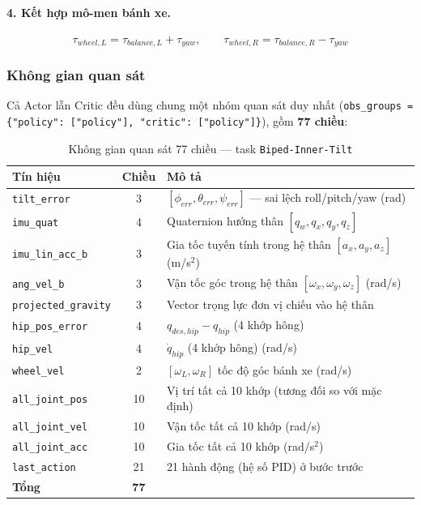 \paragraph{4. Kết hợp mô-men bánh xe.}
\begin{equation}
    \tau_{wheel,L} = \tau_{balance,L} + \tau_{yaw}, \qquad
    \tau_{wheel,R} = \tau_{balance,R} - \tau_{yaw}
    \label{eq:wheel_combine}
\end{equation}

\subsubsection{Không gian quan sát}

Cả Actor lẫn Critic đều dùng chung một nhóm quan sát duy nhất
(\texttt{obs\_groups = \{"policy": ["policy"], "critic": ["policy"]\}}),
gồm \textbf{77 chiều}:

\begin{table}[H]
    \centering
    \caption{Không gian quan sát 77 chiều — task \texttt{Biped-Inner-Tilt}}
    \label{tab:obs_inner}
    \renewcommand{\arraystretch}{1.3}
    \begin{tabular}{|l|c|l|}
    \hline
    \textbf{Tín hiệu} & \textbf{Chiều} & \textbf{Mô tả} \\
    \hline
    \texttt{tilt\_error}       & 3  & $[\phi_{err}, \theta_{err}, \psi_{err}]$ — sai lệch roll/pitch/yaw (rad) \\
    \texttt{imu\_quat}         & 4  & Quaternion hướng thân $[q_w, q_x, q_y, q_z]$ \\
    \texttt{imu\_lin\_acc\_b}  & 3  & Gia tốc tuyến tính trong hệ thân $[a_x,a_y,a_z]$ (m/s$^2$) \\
    \texttt{ang\_vel\_b}       & 3  & Vận tốc góc trong hệ thân $[\omega_x, \omega_y, \omega_z]$ (rad/s) \\
    \texttt{projected\_gravity}& 3  & Vector trọng lực đơn vị chiếu vào hệ thân \\
    \texttt{hip\_pos\_error}   & 4  & $q_{des,hip} - q_{hip}$ (4 khớp hông) \\
    \texttt{hip\_vel}          & 4  & $\dot{q}_{hip}$ (4 khớp hông) (rad/s) \\
    \texttt{wheel\_vel}        & 2  & $[\omega_L, \omega_R]$ tốc độ góc bánh xe (rad/s) \\
    \texttt{all\_joint\_pos}   & 10 & Vị trí tất cả 10 khớp (tương đối so với mặc định) \\
    \texttt{all\_joint\_vel}   & 10 & Vận tốc tất cả 10 khớp (rad/s) \\
    \texttt{all\_joint\_acc}   & 10 & Gia tốc tất cả 10 khớp (rad/s$^2$) \\
    \texttt{last\_action}      & 21 & 21 hành động (hệ số PID) ở bước trước \\
    \hline
    \textbf{Tổng}              & \textbf{77} & \\
    \hline
    \end{tabular}
\end{table}

